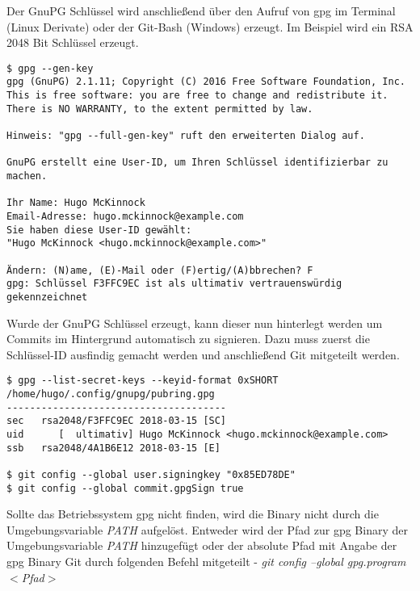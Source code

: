 Der GnuPG Schlüssel wird anschließend über den Aufruf von gpg im Terminal (Linux Derivate) oder der Git-Bash (Windows) erzeugt. Im Beispiel wird ein RSA 2048 Bit Schlüssel erzeugt.

\begin{verbatim}
$ gpg --gen-key
gpg (GnuPG) 2.1.11; Copyright (C) 2016 Free Software Foundation, Inc.
This is free software: you are free to change and redistribute it.
There is NO WARRANTY, to the extent permitted by law.

Hinweis: "gpg --full-gen-key" ruft den erweiterten Dialog auf.

GnuPG erstellt eine User-ID, um Ihren Schlüssel identifizierbar zu machen.

Ihr Name: Hugo McKinnock
Email-Adresse: hugo.mckinnock@example.com
Sie haben diese User-ID gewählt:
"Hugo McKinnock <hugo.mckinnock@example.com>"

Ändern: (N)ame, (E)-Mail oder (F)ertig/(A)bbrechen? F
gpg: Schlüssel F3FFC9EC ist als ultimativ vertrauenswürdig gekennzeichnet
\end{verbatim}

Wurde der GnuPG Schlüssel erzeugt, kann dieser nun hinterlegt werden um Commits im Hintergrund automatisch zu signieren. Dazu muss zuerst die Schlüssel-ID ausfindig gemacht werden und anschließend Git mitgeteilt werden. 

\begin{verbatim}
$ gpg --list-secret-keys --keyid-format 0xSHORT
/home/hugo/.config/gnupg/pubring.gpg
--------------------------------------
sec   rsa2048/F3FFC9EC 2018-03-15 [SC]
uid      [  ultimativ] Hugo McKinnock <hugo.mckinnock@example.com>
ssb   rsa2048/4A1B6E12 2018-03-15 [E]

$ git config --global user.signingkey "0x85ED78DE"
$ git config --global commit.gpgSign true
\end{verbatim}

\begin{INFO}
  Sollte das Betriebssystem gpg nicht finden, wird die Binary nicht durch die Umgebungsvariable \textit{PATH} aufgelöst. Entweder wird der Pfad zur gpg Binary der Umgebungsvariable \textit{PATH} hinzugefügt oder der absolute Pfad mit Angabe der gpg Binary Git durch folgenden Befehl mitgeteilt - \textit{git config --global gpg.program $ < $Pfad$ > $}
\end{INFO}
